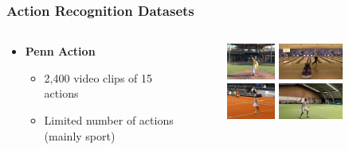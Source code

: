 \documentclass[9pt]{beamer}
\providecommand{\source}{\\ \footnotesize \tugreen{Source:} \footnotemark}
\newenvironment{myframe}[1][]{%
\begin{frame}%
\frametitle{#1}
\setcounter{footnote}{0}


}{%
\end{frame}%
}
\begin{document}
\begin{myframe}[Action Recognition Datasets]
  \begin{columns}[T]
      \begin{column}{.48\textwidth}
          \vspace{20px}
          \begin{itemize}
              \item \textbf{Penn Action\footnotemark}
              \begin{itemize}
                  \item 2,400 video clips of 15 actions
                  \item Limited number of actions (mainly sport)
              \end{itemize}
          \end{itemize}
      \end{column}
      \begin{column}{.48\textwidth}
          \begin{figure}
              \includegraphics[height=45px]{pa-01.jpg}
              \includegraphics[height=45px]{pa-02.jpg}
              \includegraphics[height=45px]{pa-03.jpg}
              \includegraphics[height=45px]{pa-04.jpg}
              \source
          \end{figure}
      \end{column}
  \end{columns}
\end{myframe}
\end{document}

